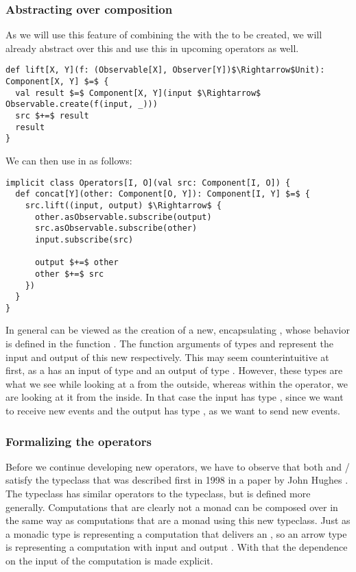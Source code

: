 \subsubsection{Abstracting over composition}
As we will use this feature of combining the \subs with the \comp to be created, we will already abstract over this and use this in upcoming operators as well.

\begin{lstlisting}[style=InlineScalaStyle]
def lift[X, Y](f: (Observable[X], Observer[Y])$\Rightarrow$Unit): Component[X, Y] $=$ {
  val result $=$ Component[X, Y](input $\Rightarrow$ Observable.create(f(input, _)))
  src $+=$ result
  result
}
\end{lstlisting}

We can then use  in  as follows:

\begin{lstlisting}[style=InlineScalaStyle]
implicit class Operators[I, O](val src: Component[I, O]) {
  def concat[Y](other: Component[O, Y]): Component[I, Y] $=$ {
    src.lift((input, output) $\Rightarrow$ {
      other.asObservable.subscribe(output)
      src.asObservable.subscribe(other)
      input.subscribe(src)

      output $+=$ other
      other $+=$ src
    })
  }
}
\end{lstlisting}

In general  can be viewed as the creation of a new, encapsulating \comp, whose behavior is defined in the function . The function arguments of types \obs and \obv represent the input and output of this new \comp respectively. This may seem counterintuitive at first, as a \comp has an input of type \obv and an output of type \obs. However, these types are what we see while looking at a \comp from the outside, whereas within the  operator, we are looking at it from the inside. In that case the input has type \obs, since we want to receive new events and the output has type \obv, as we want to send new events.

\subsubsection{Formalizing the operators}
Before we continue developing new operators, we have to observe that both  and / satisfy the  typeclass that was described first in 1998 in a paper by John Hughes . The   typeclass has similar operators to the  typeclass, but is defined more generally. Computations that are clearly not a monad can be composed over in the same way as computations that are a monad using this new typeclass. Just as a monadic type  is representing a computation that delivers an , so an arrow type  is representing a computation with input  and output . With that the dependence on the input of the computation is made explicit.

